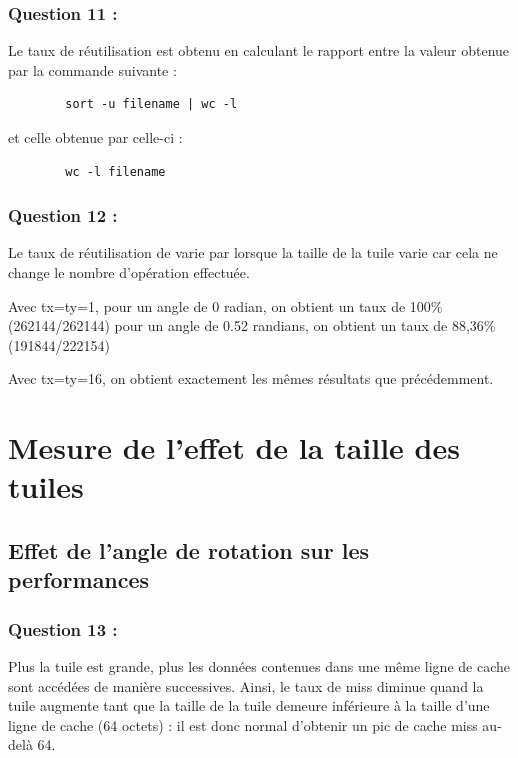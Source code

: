 \documentclass[11pt,a4paper]{article}
\begin{document}
	\subsubsection{Question 11 :}

	Le taux de réutilisation est obtenu en calculant le rapport entre la valeur
	obtenue par la commande suivante :
	\begin{verbatim}
		sort -u filename | wc -l
	\end{verbatim}
	 et celle obtenue par celle-ci :
	\begin{verbatim}
		wc -l filename
	\end{verbatim}

	\subsubsection{Question 12 :}

	Le taux de réutilisation de varie par lorsque la taille de la tuile varie
	car cela ne change le nombre d'opération effectuée.

	Avec tx=ty=1, pour un angle de 0 radian, on obtient un taux de 100\%
	(262144/262144) pour un angle de 0.52 randians, on obtient un taux de 88,36\%
	(191844/222154)
	
	Avec tx=ty=16, on obtient exactement les mêmes résultats que précédemment.

	\section{ Mesure de l’effet de la taille des tuiles}
	\subsection{Effet de l’angle de rotation sur les performances}
	\subsubsection{Question 13 :}

	Plus la tuile est grande, plus les données contenues dans une même ligne de
	cache sont accédées de manière successives. Ainsi, le taux de miss diminue
	quand la tuile augmente tant que la taille de la tuile demeure inférieure à
	la taille d'une ligne de cache (64 octets) : il est donc normal d'obtenir un
	pic de cache miss au-delà 64.
\end{document}
